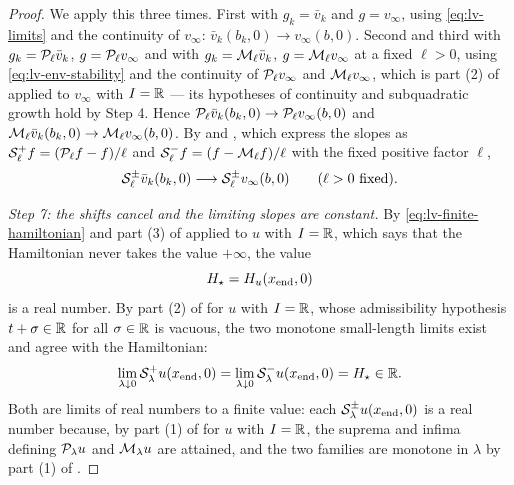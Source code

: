 \begin{proof}
We apply this three times. First with $g_k=\bar v_k$ and $g=v_\infty$, using
\eqref{eq:lv-limits} and the continuity of $v_\infty$:
$\bar v_k(b_k,0)\to v_\infty(b,0)$. Second and third with
$g_k=\mathcal{P}_\ell\bar v_k$, $g=\mathcal{P}_\ell v_\infty$ and with
$g_k=\mathcal{M}_\ell\bar v_k$, $g=\mathcal{M}_\ell v_\infty$ at a fixed $\ell>0$, using
\eqref{eq:lv-env-stability} and the continuity of $\mathcal{P}_\ell v_\infty$ and
$\mathcal{M}_\ell v_\infty$, which is part (2) of  applied to
$v_\infty$ with $I=\mathbb{R}$ — its hypotheses of continuity and subquadratic growth
hold by Step 4. Hence
$\mathcal{P}_\ell\bar v_k(b_k,0)\to\mathcal{P}_\ell v_\infty(b,0)$ and
$\mathcal{M}_\ell\bar v_k(b_k,0)\to\mathcal{M}_\ell v_\infty(b,0)$. By
 and , which express the slopes as
$\mathcal{S}_\ell^+f=(\mathcal{P}_\ell f-f)/\ell$ and
$\mathcal{S}_\ell^-f=(f-\mathcal{M}_\ell f)/\ell$ with the fixed positive factor $\ell$,
\begin{equation}\label{eq:lv-slope-convergence}
  \mathcal{S}_\ell^\pm\bar v_k(b_k,0)\longrightarrow\mathcal{S}_\ell^\pm v_\infty(b,0)
  \qquad(\ell>0\ \text{fixed}).
\end{equation}

\emph{Step 7: the shifts cancel and the limiting slopes are constant.}
By \eqref{eq:lv-finite-hamiltonian} and part (3) of
 applied to $u$ with $I=\mathbb{R}$, which says that the
Hamiltonian never takes the value $+\infty$, the value
\[
  H_\star=H_u(x_{\rm end},0)
\]
is a real number. By part (2) of  for $u$ with
$I=\mathbb{R}$, whose admissibility hypothesis $t+\sigma\in\mathbb{R}$ for all $\sigma\in\mathbb{R}$ is
vacuous, the two monotone small-length limits exist and agree with the
Hamiltonian:
\[
  \lim_{\lambda\downarrow0}\mathcal{S}_\lambda^+u(x_{\rm end},0)
  =\lim_{\lambda\downarrow0}\mathcal{S}_\lambda^-u(x_{\rm end},0)
  =H_\star\in\mathbb{R} .
\]
Both are limits of real numbers to a finite value: each
$\mathcal{S}_\lambda^\pm u(x_{\rm end},0)$ is a real number because, by part (1) of
 for $u$ with $I=\mathbb{R}$, the suprema and infima defining
$\mathcal{P}_\lambda u$ and $\mathcal{M}_\lambda u$ are attained, and the two families are
monotone in $\lambda$ by part (1) of .


\end{proof}
